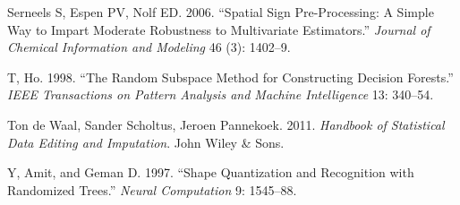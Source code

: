 \documentclass[]{book}
\theoremstyle{definition}
\theoremstyle{definition}
\theoremstyle{remark}
\begin{document}
\hypertarget{ref-ssp}{}
Serneels S, Espen PV, Nolf ED. 2006. ``Spatial Sign Pre-Processing: A
Simple Way to Impart Moderate Robustness to Multivariate Estimators.''
\emph{Journal of Chemical Information and Modeling} 46 (3): 1402--9.

\hypertarget{ref-Ho1998}{}
T, Ho. 1998. ``The Random Subspace Method for Constructing Decision
Forests.'' \emph{IEEE Transactions on Pattern Analysis and Machine
Intelligence} 13: 340--54.

\hypertarget{ref-impute1}{}
Ton de Waal, Sander Scholtus, Jeroen Pannekoek. 2011. \emph{Handbook of
Statistical Data Editing and Imputation}. John Wiley \& Sons.

\hypertarget{ref-amit1997}{}
Y, Amit, and Geman D. 1997. ``Shape Quantization and Recognition with
Randomized Trees.'' \emph{Neural Computation} 9: 1545--88.
\end{document}
